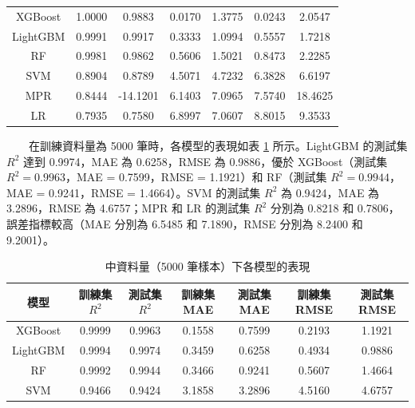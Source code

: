\documentclass[12pt,a4paper]{article}
\begin{document}
\begin{enumerate}
\begin{enumerate}[label=\arabic*.]
\begin{enumerate}[label=3-2-\arabic*.]
\begin{enumerate}[label=\Alph*.]
\begin{table}[H]
\begin{tabular}{|c|c|c|c|c|c|c|}
                            \hline
                            XGBoost & 1.0000 & 0.9883 & 0.0170 & 1.3775 & 0.0243 & 2.0547 \\
                            LightGBM & 0.9991 & 0.9917 & 0.3333 & 1.0994 & 0.5557 & 1.7218 \\
                            RF & 0.9981 & 0.9862 & 0.5606 & 1.5021 & 0.8473 & 2.2285 \\
                            SVM & 0.8904 & 0.8789 & 4.5071 & 4.7232 & 6.3828 & 6.6197 \\
                            MPR & 0.8444 & -14.1201 & 6.1403 & 7.0965 & 7.5740 & 18.4625 \\
                            LR & 0.7935 & 0.7580 & 6.8997 & 7.0607 & 8.8015 & 9.3533 \\
                            \hline
                        \end{tabular}
                    \end{table}
                　　在訓練資料量為 5000 筆時，各模型的表現如表 \ref{table:medium_data_5000} 所示。LightGBM 的測試集 \( R^2 \) 達到 0.9974，MAE 為 0.6258，RMSE 為 0.9886，優於 XGBoost（測試集 \( R^2 = 0.9963 \)，MAE = 0.7599，RMSE = 1.1921）和 RF（測試集 \( R^2 = 0.9944 \)，MAE = 0.9241，RMSE = 1.4664）。SVM 的測試集 \( R^2 \) 為 0.9424，MAE 為 3.2896，RMSE 為 4.6757；MPR 和 LR 的測試集 \( R^2 \) 分別為 0.8218 和 0.7806，誤差指標較高（MAE 分別為 6.5485 和 7.1890，RMSE 分別為 8.2400 和 9.2001）。\\
                        \begin{table}[H]
                            \centering
                            \caption{中資料量（5000 筆樣本）下各模型的表現}
                            \label{table:medium_data_5000}
                            \begin{tabular}{|c|c|c|c|c|c|c|}
                                \hline
                                模型 & 訓練集 \( R^2 \) & 測試集 \( R^2 \) & 訓練集 MAE & 測試集 MAE & 訓練集 RMSE & 測試集 RMSE \\
                                \hline
                                XGBoost & 0.9999 & 0.9963 & 0.1558 & 0.7599 & 0.2193 & 1.1921 \\
                                LightGBM & 0.9994 & 0.9974 & 0.3459 & 0.6258 & 0.4934 & 0.9886 \\
                                RF & 0.9992 & 0.9944 & 0.3466 & 0.9241 & 0.5607 & 1.4664 \\
                                SVM & 0.9466 & 0.9424 & 3.1858 & 3.2896 & 4.5160 & 4.6757 \\

\end{tabular}
\end{table}
\end{enumerate}
\end{enumerate}
\end{enumerate}
\end{enumerate}
\end{document}

